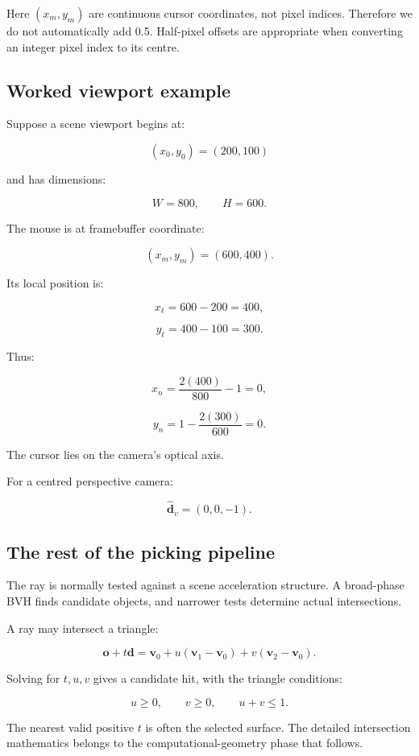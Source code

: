 Here \((x_m,y_m)\) are continuous cursor coordinates, not pixel indices. Therefore we do not automatically add 0.5. Half-pixel offsets are appropriate when converting an integer pixel index to its centre.

\subsection{Worked viewport example}\label{02-foundations-ii-ch035-worked-viewport-example}

Suppose a scene viewport begins at:

\[ (x_0,y_0)=(200,100) \]

and has dimensions:

\[ W=800,\qquad H=600. \]

The mouse is at framebuffer coordinate:

\[ (x_m,y_m)=(600,400). \]

Its local position is:

\[ x_\ell=600-200=400, \]

\[ y_\ell=400-100=300. \]

Thus:

\[ x_n=\frac{2(400)}{800}-1=0, \]

\[ y_n=1-\frac{2(300)}{600}=0. \]

The cursor lies on the camera's optical axis.

For a centred perspective camera:

\[ \boxed{ \hat{\mathbf d}_v=(0,0,-1). } \]

\subsection{The rest of the picking pipeline}\label{02-foundations-ii-ch035-the-rest-of-the-picking-pipeline}

The ray is normally tested against a scene acceleration structure. A broad-phase BVH finds candidate objects, and narrower tests determine actual intersections.

A ray may intersect a triangle:

\[ \mathbf o+t\mathbf d = \mathbf v_0+ u(\mathbf v_1-\mathbf v_0)+ v(\mathbf v_2-\mathbf v_0). \]

Solving for \(t,u,v\) gives a candidate hit, with the triangle conditions:

\[ u\ge0,\qquad v\ge0,\qquad u+v\le1. \]

The nearest valid positive \(t\) is often the selected surface. The detailed intersection mathematics belongs to the computational-geometry phase that follows.


